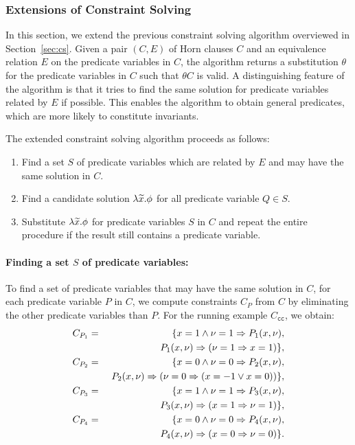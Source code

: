 \subsubsection{Extensions of Constraint Solving}
\label{sec:extcs}

In this section, we extend the previous constraint solving algorithm 
overviewed in Section~\ref{sec:cs}.  Given a pair \((C,E)\) of Horn 
clauses \(C\) and an equivalence relation \(E\) on the predicate 
variables in \(C\), the algorithm returns a substitution \(\theta\) for 
the predicate variables in \(C\) such that \(\theta C\) is valid.  A 
distinguishing feature of the algorithm is that it tries to find the 
same solution for predicate variables related by \(E\) if possible.  
This enables the algorithm to obtain general predicates, which are more 
likely to constitute invariants. %


The extended constraint solving algorithm proceeds as follows:
\begin{enumerate}
\item Find a set \(S\) of predicate variables which are related by \(E\) 
and may have the same solution in \(C\).
\item Find a candidate solution \(\lambda \widetilde{x}.\phi\) for all 
predicate variable \(Q \in S\).
\item Substitute \(\lambda \widetilde{x}.\phi\) for predicate variables \(S\) 
in \(C\) and repeat the entire procedure if the result still contains a 
predicate variable.
\end{enumerate}

\paragraph{Finding a set \(S\) of predicate variables:}
To find a set of predicate variables that may have the same solution in 
\(C\), for each predicate variable \(P\) in \(C\), we compute 
constraints \(C_P\) from \(C\) by eliminating the other predicate 
variables than \(P\).
%
For the running example \(C_{\texttt{cc}}\), we obtain:
\begin{eqnarray*}
C_{P_1}&=&\{x=1 \land \nu=1 \Rightarrow P_1(x,\nu), \\
&&\ P_1(x,\nu) \Rightarrow (\nu=1 \Rightarrow x=1)\}, \\
C_{P_2}&=&\{x=0 \land \nu=0 \Rightarrow P_2(x,\nu), \\
&&\ P_2(x,\nu) \Rightarrow (\nu=0 \Rightarrow (x=-1 \lor x=0))\}, \\
C_{P_3}&=&\{x=1 \land \nu=1 \Rightarrow P_3(x,\nu), \\
&&\ P_3(x,\nu) \Rightarrow (x=1 \Rightarrow \nu=1)\}, \\
C_{P_4}&=&\{x=0 \land \nu=0 \Rightarrow P_4(x,\nu), \\
&&\ P_4(x,\nu) \Rightarrow (x=0 \Rightarrow \nu=0)\}.
\end{eqnarray*}

